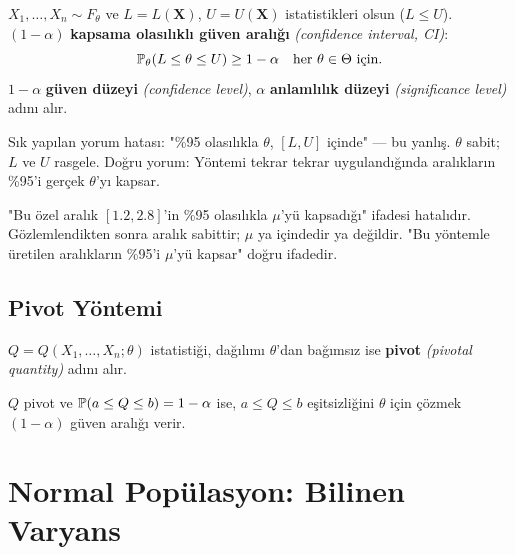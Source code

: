 \begin{tanim}\label{def:guven_araligi}
$X_1,\ldots,X_n\sim F_\theta$ ve $L=L(\mathbf{X})$, $U=U(\mathbf{X})$ istatistikleri olsun ($L\leq U$). $(1-\alpha)$ \textbf{kapsama olasılıklı güven aralığı} \emph{(confidence interval, CI)}:
\[
  \mathbb{P}_\theta(L \leq \theta \leq U) \geq 1-\alpha \quad \text{her } \theta\in\Theta \text{ için.}
\]
$1-\alpha$ \textbf{güven düzeyi} \emph{(confidence level)}, $\alpha$ \textbf{anlamlılık düzeyi} \emph{(significance level)} adını alır.
\end{tanim}

\begin{tanimgerekce}
Sık yapılan yorum hatası: "\%95 olasılıkla $\theta$, $[L,U]$ içinde" --- bu yanlış. $\theta$ sabit; $L$ ve $U$ rasgele. Doğru yorum: Yöntemi tekrar tekrar uygulandığında aralıkların \%95'i gerçek $\theta$'yı kapsar.
\end{tanimgerekce}

\begin{hataanalizi}
"Bu özel aralık $[1.2, 2.8]$'in \%95 olasılıkla $\mu$'yü kapsadığı" ifadesi hatalıdır. Gözlemlendikten sonra aralık sabittir; $\mu$ ya içindedir ya değildir. "Bu yöntemle üretilen aralıkların \%95'i $\mu$'yü kapsar" doğru ifadedir.
\end{hataanalizi}

\subsection{Pivot Yöntemi}

\begin{tanim}[Pivot]\label{def:pivot}
$Q = Q(X_1,\ldots,X_n;\theta)$ istatistiği, dağılımı $\theta$'dan bağımsız ise \textbf{pivot} \emph{(pivotal quantity)} adını alır.
\end{tanim}

\begin{teorem}\label{thm:pivot_ga}
$Q$ pivot ve $\mathbb{P}(a\leq Q\leq b)=1-\alpha$ ise, $a\leq Q\leq b$ eşitsizliğini $\theta$ için çözmek $(1-\alpha)$ güven aralığı verir.
\end{teorem}

\section{Normal Popülasyon: Bilinen Varyans}
\label{sec:normal_bilinen}

